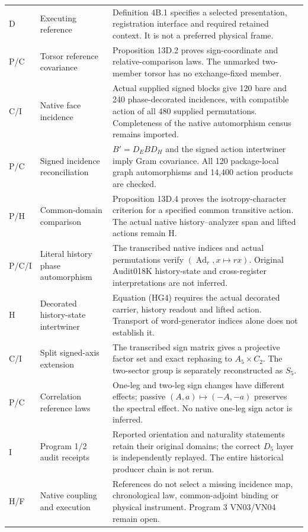 \begin{longtable}{@{}p{}p{}p{}@{}}
D & Executing reference & Definition 4B.1 specifies a selected presentation, registration interface and required retained context. It is not a preferred physical frame. \\
P/C & Torsor reference covariance & Proposition 13D.2 proves sign-coordinate and relative-comparison laws. The unmarked two-member torsor has no exchange-fixed member. \\
C/I & Native face incidence & Actual supplied signed blocks give 120 bare and 240 phase-decorated incidences, with compatible action of all 480 supplied permutations. Completeness of the native automorphism census remains imported. \\
P/C & Signed incidence reconciliation & $B'=D_EBD_H$ and the signed action intertwiner imply Gram covariance. All 120 package-local graph automorphisms and 14,400 action products are checked. \\
P/H & Common-domain comparison & Proposition 13D.4 proves the isotropy-character criterion for a specified common transitive action. The actual native history--analyzer span and lifted actions remain H. \\
P/C/I & Literal history phase automorphism & The transcribed native indices and actual permutations verify $(\operatorname{Ad}_r,x\mapsto rx)$. Original Audit018K history-state and cross-register interpretations are not inferred. \\
H & Decorated history-state intertwiner & Equation (HG4) requires the actual decorated carrier, history readout and lifted action. Transport of word-generator indices alone does not establish it. \\
C/I & Split signed-axis extension & The transcribed sign matrix gives a projective factor set and exact rephasing to $A_5\times C_2$. The two-sector group is separately reconstructed as $S_5$. \\
P/C & Correlation reference laws & One-leg and two-leg sign changes have different effects; passive $(A,a)\mapsto(-A,-a)$ preserves the spectral effect. No native one-leg sign actor is inferred. \\
I & Program 1/2 audit receipts & Reported orientation and naturality statements retain their original domains; the correct $D_5$ layer is independently replayed. The entire historical producer chain is not rerun. \\
H/F & Native coupling and execution & References do not select a missing incidence map, chronological law, common-adjoint binding or physical instrument. Program 3 VN03/VN04 remain open. \\
\bottomrule
\end{longtable}
\normalsize



